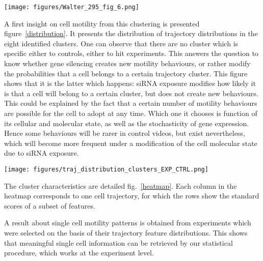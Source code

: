 \begin{figure*}[!ht]
\centerline{\texttt{[image: figures/Walter\_295\_fig\_6.png]}}
\caption{Evaluation of k-means clustering quality as a function of the number of clusters (average and standard deviation on 10 algorithm initializations). The same protocol was applied to a subset of the Mitocheck dataset, and two samples of the same dimensions, respectively drawn from the Uniform and the Normal distributions. }
\label{clusterscore}
\end{figure*}

A first insight on cell motility from this clustering is presented figure~\ref{distribution}. It presents the distribution of trajectory distributions in the eight identified clusters. One can observe that there are no cluster which is specific either to controls, either to hit experiments. This answers the question to know whether gene silencing creates new motility behaviours, or rather modify the probabilities that a cell belongs to a certain trajectory cluster. This figure shows that it is the latter which happens: siRNA exposure modifies how likely it is that a cell will belong to a certain cluster, but does not create new behaviours. This could be explained by the fact that a certain number of motility behaviours are possible for the cell to adopt at any time. Which one it chooses is function of its cellular and molecular state, as well as the stochasticity of gene expression. Hence some behaviours will be rarer in control videos, but exist nevertheless, which will become more frequent under a modification of the cell molecular state due to siRNA exposure.

\begin{figure*}[!ht]
\centering
\texttt{[image: figures/traj\_distribution\_clusters\_EXP\_CTRL.png]}
\caption{Comparison of cluster distributions between controls (Ctrl) and experiments (Exp) for the eight trajectory clusters which were identified in the Mitocheck dataset. The clusters are in the same order as in figure ~\ref{heatmap}.}
\label{distribution}
\end{figure*}
 
The cluster characteristics are detailed fig.~\ref{heatmap}. Each column in the heatmap corresponds to one cell trajectory, for which the rows show the standard scores of a subset of features. 

A result about single cell motility patterns is obtained from experiments which were selected on the basis of their trajectory feature distributions. This shows that meaningful single cell information can be retrieved by our statistical procedure, which works at the experiment level.


